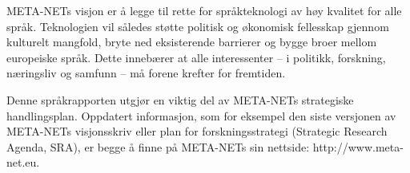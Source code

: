 \begin{multicols}{2}
META-NETs visjon er å legge til rette for språkteknologi av høy
kvalitet for alle språk. Teknologien vil således støtte politisk og
økonomisk fellesskap gjennom kulturelt mangfold, bryte ned
eksisterende barrierer og bygge broer mellom europeiske språk. Dette
innebærer at alle interessenter -- i politikk, forskning, næringsliv
og samfunn -- må forene krefter for fremtiden.

Denne språkrapporten utgjør en viktig del av META-NETs strategiske
handlingsplan. Oppdatert informasjon, som for eksempel den siste
versjonen av META-NETs visjonsskriv \cite{Meta1} eller plan for
forskningsstrategi (Strategic Research Agenda, SRA), er begge å finne
på META-NETs sin nettside: http://www.meta-net.eu.
\end{multicols}

\clearpage


